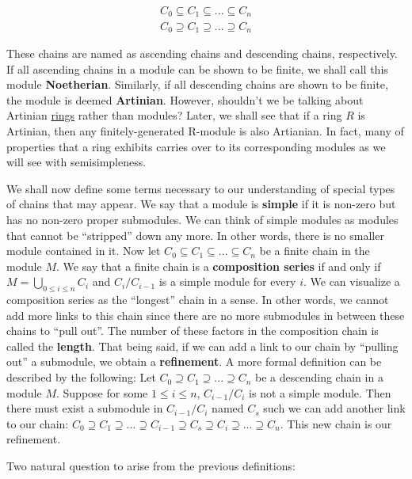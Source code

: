 \documentclass[11pt]{article}
\begin{document}
\begin{gather}
  C_0 \subseteq C_1 \subseteq ... \subseteq C_n \\
  C_0 \supseteq  C_1 \supseteq  ... \supseteq C_n 
\end{gather}

These chains are named as ascending chains and descending chains, respectively. If all ascending chains in a module can be shown to be finite, we shall call this module \textbf{Noetherian}. Similarly, if all descending chains are shown to be finite, the module is deemed \textbf{Artinian}. However, shouldn't we be talking about 
Artinian \underline{rings} rather than modules? Later, we shall see that if a ring $R$ is Artinian, then any finitely-generated R-module is also Artianian. In fact, many of properties that a ring exhibits carries over to its corresponding modules as we will see with semisimpleness.\newline

We shall now define some terms necessary to our understanding of special types of chains that may appear. We say that a module is \textbf{simple} if it is non-zero but has no non-zero proper submodules. We can think of simple modules as modules that cannot be ``stripped'' down any more. In other words, there is no smaller module contained in it.
Now let $C_0 \subseteq C_1 \subseteq ... \subseteq C_n$ be a finite chain in the module $M$. We say that a finite chain is a \textbf{composition series} if and only if $M = \bigcup_{0 \leq i \leq n} C_i$ and $C_i/C_{i-1}$ is a simple module for every $i$. We can visualize a composition series as the ``longest'' chain in a sense. In other words, we cannot add more links to this chain since there are no more
submodules in between these chains to ``pull out''. The number of these factors in the composition chain is called the \textbf{length}. That being said, if we can add a link to our chain by ``pulling out'' a submodule, we obtain a \textbf{refinement}. A more formal definition can be described by the following: Let $C_0 \supseteq  C_1 \supseteq  ... \supseteq C_n$ be a descending chain in a module 
$M$. Suppose for some $1 \leq i \leq n$, $C_{i-1}/C_{i}$ is not a simple module. Then there must exist a submodule in $C_{i-1}/C_{i}$ named $C_s$ such we can add another link to our chain: $C_0 \supseteq  C_1 \supseteq ...  \supseteq C_{i-1} \supseteq C_s \supseteq C_i \supseteq ... \supseteq C_n$. This new chain is our refinement.  \newline

\noindent
Two natural question to arise from the previous definitions: 
\end{document}
